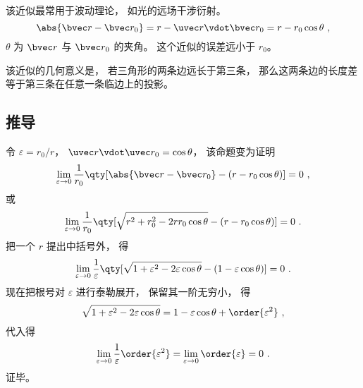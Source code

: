 

该近似最常用于波动理论， 如光的远场干涉衍射。
\begin{equation}
\abs{\bvec r - \bvec r_0} = r - \uvec r \vdot \bvec r_0 = r - r_0 \cos\theta~,
\end{equation}
$\theta$ 为 $\bvec r$ 与 $\bvec r_0$ 的夹角。 这个近似的误差远小于 $r_0$。

该近似的几何意义是， 若三角形的两条边远长于第三条， 那么这两条边的长度差等于第三条在任意一条临边上的投影。 %

\subsection{推导}

令 $\varepsilon = r_0 / r$， $\uvec r \vdot \uvec r_0 = \cos\theta$， 该命题变为证明
\begin{equation}
\lim_{\varepsilon \to 0} \frac{1}{r_0} \qty[\abs{\bvec r - \bvec r_0} - (r - r_0 \cos\theta)] = 0~,
\end{equation}
或
\begin{equation}
\lim_{\varepsilon \to 0} \frac{1}{r_0} \qty[\sqrt{r^2 + r_0^2 - 2rr_0\cos\theta} - (r - r_0 \cos\theta)] = 0~.
\end{equation}
把一个 $r$ 提出中括号外， 得
\begin{equation}
\lim_{\varepsilon \to 0} \frac{1}{\varepsilon} \qty[\sqrt{1 + \varepsilon^2 - 2\varepsilon\cos\theta} - (1 - \varepsilon \cos\theta)] = 0~.
\end{equation}
现在把根号对 $\varepsilon$ 进行泰勒展开， 保留其一阶无穷小， 得
\begin{equation}
\sqrt{1 + \varepsilon^2 - 2\varepsilon\cos\theta} = 1 - \varepsilon \cos\theta + \order{\varepsilon^2}~,
\end{equation}
代入得
\begin{equation}
\lim_{\varepsilon \to 0} \frac1\varepsilon \order{\varepsilon^2} = \lim_{\varepsilon \to 0} \order{\varepsilon} = 0~.
\end{equation}
证毕。
